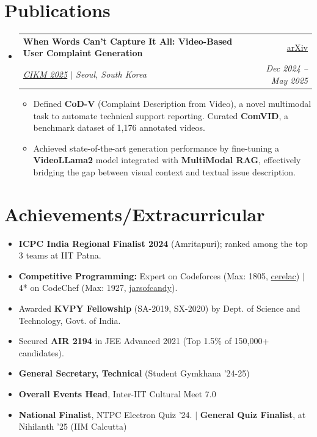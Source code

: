 \documentclass[letterpaper,11pt]{article}
\makeatletter
\newcommand{\resumeItem}[1]{
  \item\small{
    {#1 \vspace{-2pt}}
  }
}
\newcommand{\resumeProjectHeading}[4]{
    \item
    \begin{tabular*}{0.97\textwidth}{l@{\extracolsep{\fill}}r}
      \small#1 & #2 \\
      \textit{\small#3} & \textit{\small #4} \\
    \end{tabular*}\vspace{-7pt}
}
\newcommand{\resumeSubHeadingListStart}{\begin{itemize}[leftmargin=0.15in, label={\raisebox{0.2\height}{\tiny$\bullet$}}, itemsep=0pt, topsep=0pt]}
\newcommand{\resumeSubHeadingListEnd}{\end{itemize}}
\newcommand{\resumeItemListStart}{\begin{itemize}[itemsep=0pt, topsep=1pt]}
\newcommand{\resumeItemListEnd}{\end{itemize}\vspace{-5pt}}
\makeatother
\begin{document}
\section{Publications}
\resumeSubHeadingListStart

    \resumeProjectHeading
  {\textbf{When Words Can’t Capture It All: Video-Based User Complaint Generation}}{\href{https://arxiv.org/abs/2509.19952}{arXiv}}
  {\textit{\href{https://cikm2025.org/}{CIKM 2025}} $|$ Seoul, South Korea} {Dec 2024 -- May 2025}
  \resumeItemListStart
      \resumeItem{Defined \textbf{CoD-V} (Complaint Description from Video), a novel multimodal task to automate technical support reporting. Curated \textbf{ComVID}, a benchmark dataset of 1,176 annotated videos.}
      \resumeItem{Achieved state-of-the-art generation performance by fine-tuning a \textbf{VideoLLama2} model integrated with \textbf{MultiModal RAG}, effectively bridging the gap between visual context and textual issue description.}
  \resumeItemListEnd


\resumeSubHeadingListEnd

\section{Achievements/Extracurricular}
  \resumeSubHeadingListStart
    \resumeItem{\textbf{ICPC India Regional Finalist 2024} (Amritapuri); ranked among the top 3 teams at IIT Patna.}
    \resumeItem{\textbf{Competitive Programming:} Expert on Codeforces (Max: 1805, \href{https://codeforces.com/profile/cerelac}{cerelac}) $|$ 4* on CodeChef (Max: 1927, \href{https://www.codechef.com/users/jarsofcandy}{jarsofcandy}).}
    \resumeItem{Awarded \textbf{KVPY Fellowship} (SA-2019, SX-2020) by Dept. of Science and Technology, Govt. of India.}
    \resumeItem{Secured \textbf{AIR 2194} in JEE Advanced 2021 (Top 1.5\% of 150,000+ candidates).}
    \resumeItem{\textbf{General Secretary, Technical} (Student Gymkhana '24-25)}
    \resumeItem{\textbf{Overall Events Head}, Inter-IIT Cultural Meet 7.0}
    \resumeItem{\textbf{National Finalist}, NTPC Electron Quiz '24. $|$ \textbf{General Quiz Finalist}, at Nihilanth '25 (IIM Calcutta)}
  \resumeSubHeadingListEnd
\end{document}
